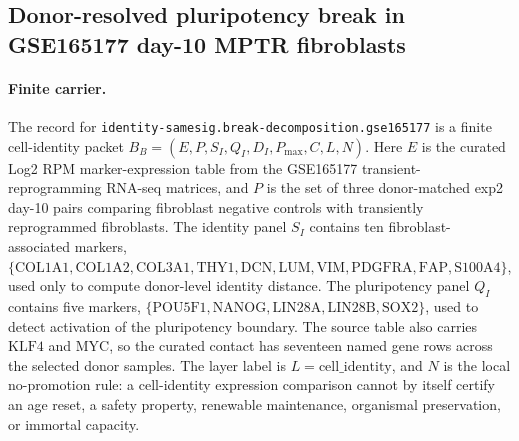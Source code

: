 \subsection{Donor-resolved pluripotency break in GSE165177 day-10 MPTR fibroblasts}
\label{subsec:identity-samesig-break-decomposition-gse165177}

\paragraph{Finite carrier.}
The record for \texttt{identity-samesig.break-decomposition.gse165177} is a finite cell-identity packet
$B_B=(E,P,S_I,Q_I,D_I,P_{\max},C,L,N)$.  Here $E$ is the curated Log2 RPM marker-expression table from the GSE165177 transient-reprogramming RNA-seq matrices, and $P$ is the set of three donor-matched exp2 day-10 pairs comparing fibroblast negative controls with transiently reprogrammed fibroblasts.  The identity panel $S_I$ contains ten fibroblast-associated markers,
$\{\mathrm{COL1A1},\mathrm{COL1A2},\mathrm{COL3A1},\mathrm{THY1},\mathrm{DCN},\mathrm{LUM},\mathrm{VIM},\mathrm{PDGFRA},\mathrm{FAP},\mathrm{S100A4}\}$,
used only to compute donor-level identity distance.  The pluripotency panel $Q_I$ contains five markers,
$\{\mathrm{POU5F1},\mathrm{NANOG},\mathrm{LIN28A},\mathrm{LIN28B},\mathrm{SOX2}\}$,
used to detect activation of the pluripotency boundary.  The source table also carries $\mathrm{KLF4}$ and $\mathrm{MYC}$, so the curated contact has seventeen named gene rows across the selected donor samples.  The layer label is $L=\mathrm{cell\_identity}$, and $N$ is the local no-promotion rule: a cell-identity expression comparison cannot by itself certify an age reset, a safety property, renewable maintenance, organismal preservation, or immortal capacity.

